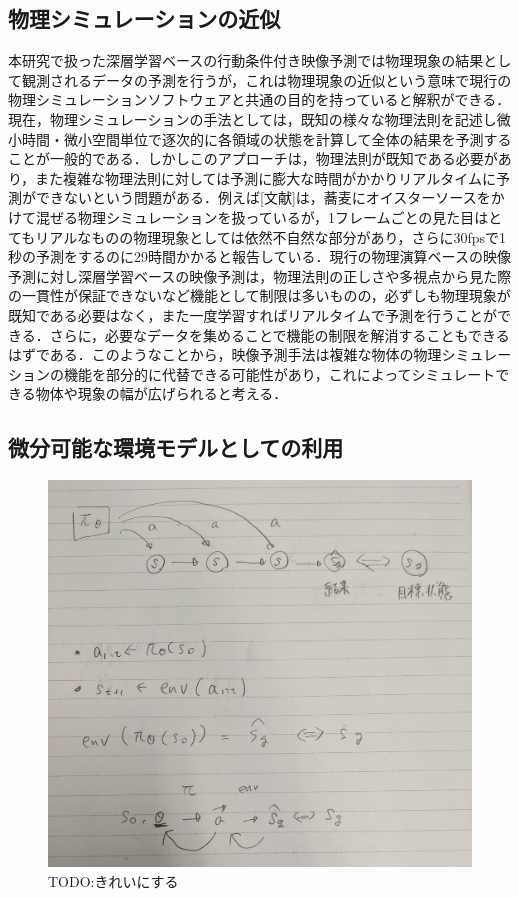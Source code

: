 \subsection{物理シミュレーションの近似}

本研究で扱った深層学習ベースの行動条件付き映像予測では物理現象の結果として観測されるデータの予測を行うが，これは物理現象の近似という意味で現行の物理シミュレーションソフトウェアと共通の目的を持っていると解釈ができる．現在，物理シミュレーションの手法としては，既知の様々な物理法則を記述し微小時間・微小空間単位で逐次的に各領域の状態を計算して全体の結果を予測することが一般的である．しかしこのアプローチは，物理法則が既知である必要があり，また複雑な物理法則に対しては予測に膨大な時間がかかりリアルタイムに予測ができないという問題がある．例えば[文献]は，蕎麦にオイスターソースをかけて混ぜる物理シミュレーションを扱っているが，1フレームごとの見た目はとてもリアルなものの物理現象としては依然不自然な部分があり，さらに30fpsで1秒の予測をするのに29時間かかると報告している．現行の物理演算ベースの映像予測に対し深層学習ベースの映像予測は，物理法則の正しさや多視点から見た際の一貫性が保証できないなど機能として制限は多いものの，必ずしも物理現象が既知である必要はなく，また一度学習すればリアルタイムで予測を行うことができる．さらに，必要なデータを集めることで機能の制限を解消することもできるはずである．このようなことから，映像予測手法は複雑な物体の物理シミュレーションの機能を部分的に代替できる可能性があり，これによってシミュレートできる物体や現象の幅が広げられると考える．

\subsection{微分可能な環境モデルとしての利用}

\begin{figure}
    \begin{center}
      \includegraphics[width=\linewidth]{./figures/MWD.jpg}
      \caption[TODO:この図きれいにする]{TODO:きれいにする}
      \label{fig:MWD}
    \end{center}
  \end{figure}

